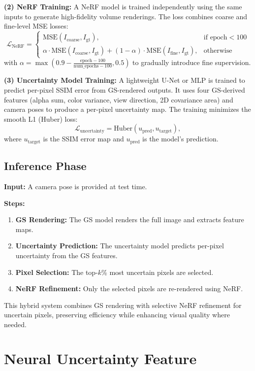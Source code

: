 \documentclass[10pt,letterpaper]{article}
\begin{document}
\textbf{(2) NeRF Training:} A NeRF model is trained independently using the same inputs to generate high-fidelity volume renderings. The loss combines coarse and fine-level MSE losses:
\[
\mathcal{L}_{\text{NeRF}} = 
\begin{cases}
	\text{MSE}(I_{\text{coarse}}, I_{\text{gt}}), & \text{if } \text{epoch} < 100 \\
	\alpha \cdot \text{MSE}(I_{\text{coarse}}, I_{\text{gt}}) + (1 - \alpha) \cdot \text{MSE}(I_{\text{fine}}, I_{\text{gt}}), & \text{otherwise}
\end{cases}
\]
with $\alpha = \max(0.9 - \frac{\text{epoch} - 100}{\text{num\_epochs} - 100}, 0.5)$ to gradually introduce fine supervision.

\textbf{(3) Uncertainty Model Training:} A lightweight U-Net or MLP is trained to predict per-pixel SSIM error from GS-rendered outputs. It uses four GS-derived features (alpha sum, color variance, view direction, 2D covariance area) and camera poses to produce a per-pixel uncertainty map. The training minimizes the smooth L1 (Huber) loss:
\[
\mathcal{L}_{\text{uncertainty}} = \text{Huber}(u_{\text{pred}}, u_{\text{target}}),
\]
where $u_{\text{target}}$ is the SSIM error map and $u_{\text{pred}}$ is the model's prediction.


\subsection{Inference Phase}
\textbf{Input:} A camera pose is provided at test time.

\textbf{Steps:}
\begin{enumerate}[leftmargin=*]
	\item \textbf{GS Rendering:} The GS model renders the full image and extracts feature maps.
	\item \textbf{Uncertainty Prediction:} The uncertainty model predicts per-pixel uncertainty from the GS features.
	\item \textbf{Pixel Selection:} The top-$k$\% most uncertain pixels are selected.
	\item \textbf{NeRF Refinement:} Only the selected pixels are re-rendered using NeRF.
\end{enumerate}

\vspace{1mm}
This hybrid system combines GS rendering with selective NeRF refinement for uncertain pixels, preserving efficiency while enhancing visual quality where needed.

\section{Neural Uncertainty Feature}
\end{document}
